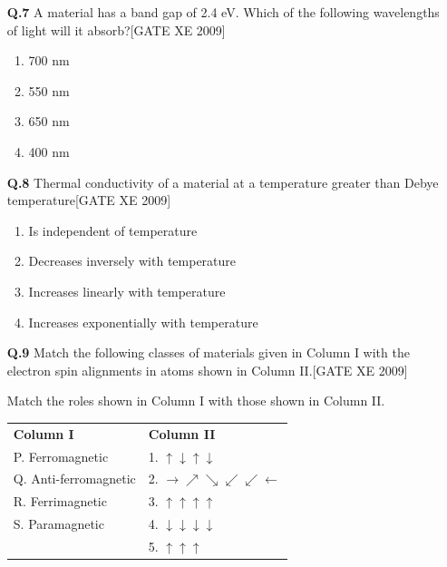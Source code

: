 \documentclass[journal,12pt,onecolumn]{IEEEtran}
\theoremstyle{remark}
\begin{document}
\begin{enumerate}
\vspace{0.3cm}

\item[\textbf{Q.7}] A material has a band gap of 2.4 eV. Which of the following wavelengths of light will it absorb?\hfill[GATE XE 2009]

\begin{multicols}{2}
\begin{enumerate}
    \item 700 nm
    \item 550 nm
    \item 650 nm
    \item 400 nm
\end{enumerate}
\end{multicols}

\vspace{0.3cm}

\item[\textbf{Q.8}] Thermal conductivity of a material at a temperature greater than Debye temperature\hfill[GATE XE 2009]

\begin{multicols}{2}
\begin{enumerate}
    \item Is independent of temperature
    \item Decreases inversely with temperature
    \item Increases linearly with temperature
    \item Increases exponentially with temperature
\end{enumerate}
\end{multicols}


\vspace{0.5cm}



\item [\textbf{Q.9}] Match the following classes of materials given in Column I with the electron spin alignments in atoms shown in Column II.\hfill[GATE XE 2009]

\vspace{1em}

\noindent
Match the roles shown in Column I with those shown in Column II.

\begin{tabular}{@{}p{}p{}@{}}
\textbf{Column I} & \textbf{Column II} \\
P. Ferromagnetic & 1. $\uparrow\downarrow\uparrow\downarrow$ \\
Q. Anti-ferromagnetic & 2. $\rightarrow \nearrow \searrow\swarrow\swarrow \leftarrow$ \\
R. Ferrimagnetic & 3. $\uparrow\uparrow\uparrow\uparrow$ \\
S. Paramagnetic & 4. $\downarrow\downarrow\downarrow\downarrow$ \\
& 5. $\uparrow\uparrow\uparrow$ \\
\end{tabular}


\end{enumerate}
\end{document}
